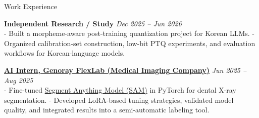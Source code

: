 \documentclass{resume} %
\begin{document}
\begin{rSection}{Work Experience}

\textbf{Independent Research / Study} \hfill {\em Dec 2025 -- Jun 2026} \\
- Built a morpheme-aware post-training quantization project for Korean LLMs.
- Organized calibration-set construction, low-bit PTQ experiments, and evaluation workflows for Korean-language models.

\href{https://genoray.com/?Lang=KR}{\bf AI Intern, Genoray FlexLab (Medical Imaging Company)} \hfill {\em Jun 2025 -- Aug 2025} \\
- Fine-tuned \href{https://disco-candy-c65.notion.site/SAM-HQ-Conv_LoRA-2582d399f9118056977fe4d4a6b6f7c0?source=copy_link}{Segment Anything Model (SAM)} in PyTorch for dental X-ray segmentation.
- Developed LoRA-based tuning strategies, validated model quality, and integrated results into a semi-automatic labeling tool.  

\end{rSection}

\end{document}
